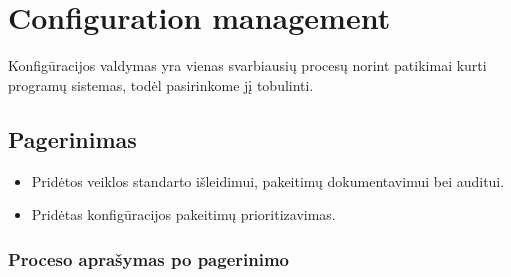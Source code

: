 \documentclass{VUMIFPSkursinis}
\begin{document}
	\section{Configuration management}
	Konfigūracijos valdymas yra vienas svarbiausių procesų norint patikimai kurti programų sistemas, todėl pasirinkome jį tobulinti.
		\subsection{Pagerinimas}
		\begin{itemize}
			\item Pridėtos veiklos standarto išleidimui, pakeitimų dokumentavimui bei auditui.
			\item Pridėtas konfigūracijos pakeitimų prioritizavimas.
		\end{itemize}
			\subsubsection{Proceso aprašymas po pagerinimo}
\end{document}

